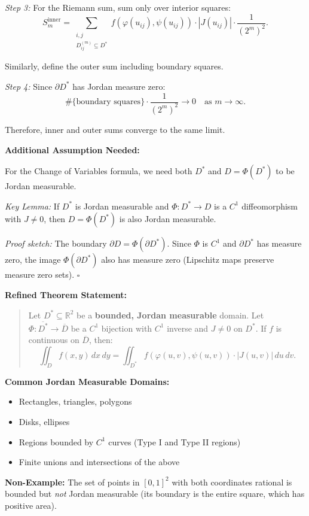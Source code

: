 \documentclass[11pt]{report}
\newcommand{\R}{\mathbb{R}}
\begin{document}
\begin{remark}
\textit{Step 3:} For the Riemann sum, sum only over interior squares:
\[
S_m^{\text{inner}} = \sum_{\substack{i,j \\ D_{ij}^{(m)} \subseteq D^*}} f(\varphi(u_{ij}), \psi(u_{ij})) \cdot |J(u_{ij})| \cdot \frac{1}{(2^m)^2}.
\]

Similarly, define the outer sum including boundary squares.

\textit{Step 4:} Since $\partial D^*$ has Jordan measure zero:
\[
\#\{\text{boundary squares}\} \cdot \frac{1}{(2^m)^2} \to 0 \quad \text{as } m \to \infty.
\]

Therefore, inner and outer sums converge to the same limit.

\textbf{Additional Assumption Needed:}

For the Change of Variables formula, we need both $D^*$ and $D = \Phi(D^*)$ to be Jordan measurable.

\textit{Key Lemma:} If $D^*$ is Jordan measurable and $\Phi: D^* \to D$ is a $C^1$ diffeomorphism with $J \neq 0$, then $D = \Phi(D^*)$ is also Jordan measurable.

\textit{Proof sketch:} The boundary $\partial D = \Phi(\partial D^*)$. Since $\Phi$ is $C^1$ and $\partial D^*$ has measure zero, the image $\Phi(\partial D^*)$ also has measure zero (Lipschitz maps preserve measure zero sets). \hfill $\square$

\textbf{Refined Theorem Statement:}

\begin{quote}
Let $D^* \subseteq \R^2$ be a \textbf{bounded, Jordan measurable} domain. Let $\Phi: \overline{D^*} \to \overline{D}$ be a $C^1$ bijection with $C^1$ inverse and $J \neq 0$ on $D^*$. If $f$ is continuous on $\overline{D}$, then:
\[
\iint_D f(x, y) \, dx \, dy = \iint_{D^*} f(\varphi(u, v), \psi(u, v)) \cdot |J(u, v)| \, du \, dv.
\]
\end{quote}

\textbf{Common Jordan Measurable Domains:}
\begin{itemize}
    \item Rectangles, triangles, polygons
    \item Disks, ellipses
    \item Regions bounded by $C^1$ curves (Type I and Type II regions)
    \item Finite unions and intersections of the above
\end{itemize}

\textbf{Non-Example:} The set of points in $[0,1]^2$ with both coordinates rational is bounded but \textit{not} Jordan measurable (its boundary is the entire square, which has positive area).
\end{remark}
\end{document}
